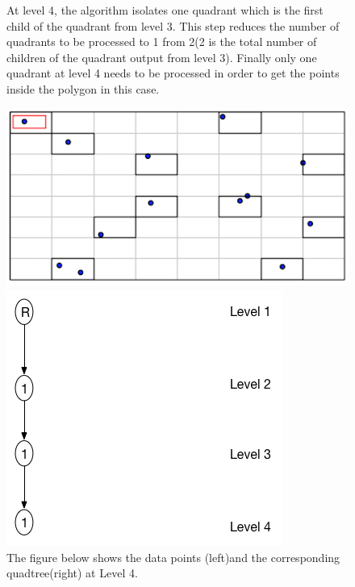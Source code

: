 \documentclass{article}
\begin{document}
\begin{figure}[H]
At level 4, the algorithm isolates one quadrant which is the first child of the quadrant from level 3.
This step reduces the number of quadrants to be processed to 1 from 2(2 is the total number of children of the quadrant output from level 3).
Finally only one quadrant at level 4 needs to be processed in order to get the points inside the polygon in this case.

  \centering
  \begin{minipage}[b]{0.35\textwidth}
    \includegraphics[width=\textwidth]{1_1Quad1_4}  
  \end{minipage}
  \hfill
  \begin{minipage}[b]{0.5\textwidth}
    \includegraphics[width=\textwidth]{1Quad_4_tree}
  \end{minipage}
  \caption{The figure below shows the data points (left)and the corresponding quadtree(right) at Level 4.}
\end{figure}
\end{document}

